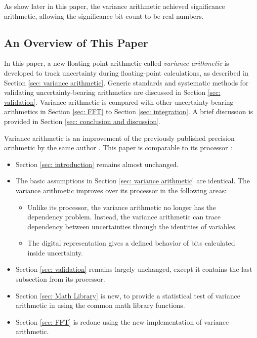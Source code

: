 \documentclass[twoside]{article}
\numberwithin{equation}{section}
\begin{document}
As show later in this paper, the variance arithmetic achieved significance arithmetic, allowing the significance bit count to be real numbers.



\subsection{ An Overview of This Paper}

In this paper, a new floating-point arithmetic called \emph{variance arithmetic} is developed to track uncertainty during floating-point calculations, as described in Section \ref{sec: variance arithmetic}.  
Generic standards and systematic methods for validating uncertainty-bearing arithmetics are discussed in Section \ref{sec: validation}.  
Variance arithmetic is compared with other uncertainty-bearing arithmetics in Section \ref{sec: FFT} to Section \ref{sec: integration}.  A brief discussion is provided in Section \ref{sec: conclusion and discussion}.

Variance arithmetic is an improvement of the previously published precision arithmetic by the same author \cite{Prev_Precision_Arithmetic}.
This paper is comparable to its processor \cite{Prev_Precision_Arithmetic}:
\begin{itemize}
\item Section \ref{sec: introduction} remains almost unchanged.

\item The basic assumptions in Section \ref{sec: variance arithmetic} are identical.
The variance arithmetic improves over its processor in the following areas:
\begin{itemize}
\item Unlike its processor, the variance arithmetic no longer has the dependency problem.
Instead, the variance arithmetic can trace dependency between uncertainties through the identities of variables.

\item The digital representation gives a defined behavior of bits calculated inside uncertainty. 
\end{itemize}

\item Section \ref{sec: validation} remains largely unchanged, except it contains the last subsection from  its processor.

\item Section \ref{sec: Math Library} is new, to provide a statistical test of variance arithmetic in using the common math library functions.

\item Section \ref{sec: FFT} is redone using the new implementation of variance arithmetic.

\end{itemize}
\end{document}
